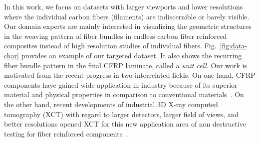 In this work, we focus on datasets with larger viewports and lower resolutions where the individual carbon fibers (filaments) are indiscernible or barely visible. Our domain experts are mainly interested in visualizing the geometric structures in the weaving pattern of fiber bundles in endless carbon fiber reinforced composites instead of high resolution studies of individual fibers.
Fig.~\ref{fig:data-char} provides an example of our targeted dataset. It also shows the recurring fiber bundle pattern in the final CFRP laminate, called a \textit{unit cell}.
Our work is motivated from the recent progress in two interrelated fields: On one hand, CFRP components have gained wide application in industry because of its superior material and physical properties in comparison to conventional materials~\cite{Karpat2012}. On the other hand, recent developments of industrial 3D X-ray computed tomography (XCT) with regard to larger detectors, larger field of views, and better resolutions opened XCT for this new application area of non destructive testing for fiber reinforced components~\cite{Schilling2005}. 
%
